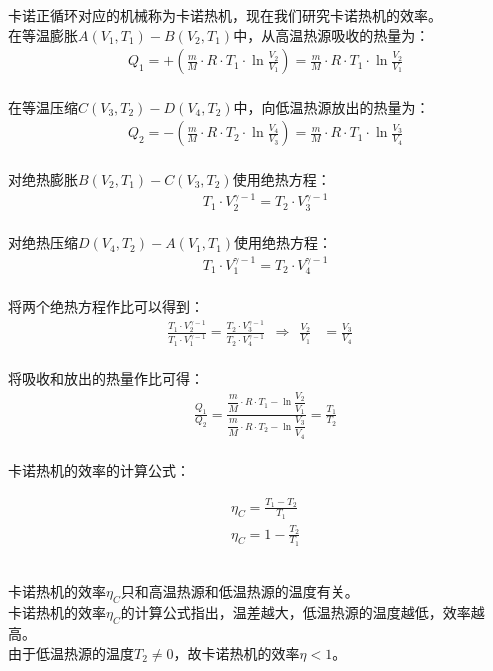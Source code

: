 \documentclass[UTF8]{ctexart}
\begin{document}
    卡诺正循环对应的机械称为卡诺热机，现在我们研究卡诺热机的效率。\\[3mm]
    在等温膨胀$A(V_1,T_1)-B(V_2,T_1)$中，从高温热源吸收的热量为：\vspace{5pt}
    \begin{align}
        &Q_1=+\left(\frac{m}{M}\cdot R\cdot T_1\cdot\ln{\frac{V_2}{V_1}}\right)=\frac{m}{M}\cdot R\cdot T_1\cdot\ln{\frac{V_2}{V_1}}
    \end{align}\\
    在等温压缩$C(V_3,T_2)-D(V_4,T_2)$中，向低温热源放出的热量为：\vspace{5pt}
    \begin{align}
        &Q_2=-\left(\frac{m}{M}\cdot R\cdot T_2\cdot\ln{\frac{V_4}{V_3}}\right)=\frac{m}{M}\cdot R\cdot T_1\cdot\ln{\frac{V_3}{V_4}}
    \end{align}\\
    对绝热膨胀$B(V_2,T_1)-C(V_3,T_2)$使用绝热方程：
    \begin{align}
        &T_1\cdot V_2^{\gamma-1}=T_2\cdot V_3^{\gamma-1}
    \end{align}\\
    对绝热压缩$D(V_4,T_2)-A(V_1,T_1)$使用绝热方程：
    \begin{align}
        &T_1\cdot V_1^{\gamma-1}=T_2\cdot V_4^{\gamma-1}
    \end{align}\\
    将两个绝热方程作比可以得到：
    \begin{align}
        \frac{T_1\cdot V_2^{\gamma-1}}{T_1\cdot V_1^{\gamma-1}}=\frac{T_2\cdot V_3^{\gamma-1}}{T_2\cdot V_4^{\gamma-1}}~~\Rightarrow~~\frac{V_2}{V_1}&=\frac{V_3}{V_4}
    \end{align}\\
    将吸收和放出的热量作比可得：
    \begin{align}
        &\frac{Q_1}{Q_2}=\frac{\dfrac{m}{M}\cdot R\cdot T_1-\ln{\dfrac{V_2}{V_1}}}{\dfrac{m}{M}\cdot R\cdot T_2-\ln{\dfrac{V_3}{V_4}}}=\frac{T_1}{T_2}
    \end{align}\\
    卡诺热机的效率的计算公式：
    \begin{large}
        \begin{align*}
            &\eta_C=\frac{T_1-T_2}{T_1}\\[4mm]
            &\eta_C=1-\frac{T_2}{T_1}
        \end{align*}
    \end{large}\\
    卡诺热机的效率$\eta_C$只和高温热源和低温热源的温度有关。\\[3mm]
    卡诺热机的效率$\eta_C$的计算公式指出，温差越大，低温热源的温度越低，效率越高。\\[3mm]
    由于低温热源的温度$T_2\neq 0$，故卡诺热机的效率$\eta<1$。
\end{document}
